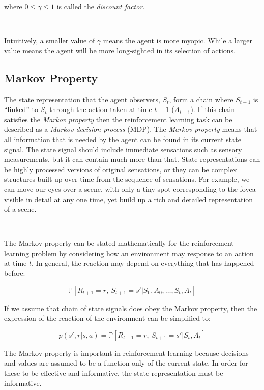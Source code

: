 \documentclass{article}
\begin{document}
where $0 \leq \gamma \leq 1$ is called the \textit{discount factor}.

\

Intuitively, a smaller value of $\gamma$ means the agent is more myopic. While a larger value means the agent will be more long-sighted in its selection of actions.

\subsection{Markov Property}

 The state representation that the agent observers, $S_t$, form a chain where $S_{t-1}$ is ``linked'' to $S_t$ through the action taken at time $t - 1$ ($A_{t-1}$). If this chain satisfies the \textit{Markov property} then the reinforcement learning task can be described as a \textit{Markov decision process} (MDP). The \textit{Markov property} means that all information that is needed by the agent can be found in its current state signal. The state signal should include immediate sensations such as sensory measurements, but it can contain much more than that. State representations can be highly processed versions of original sensations, or they can be complex structures built up over time from the sequence of sensations. For example, we can move our eyes over a scene, with only a tiny spot corresponding to the fovea visible in detail at any one time, yet build up a rich and detailed representation of a scene. \citep{sutton2018reinforcement}
 
 \
 
 The Markov property can be stated mathematically for the reinforcement learning problem by considering how an environment may response to an action at time $t$. In general, the reaction may depend on everything that has happened before:
 
 \begin{equation}
 	\mathbb{P}[ R_{t+1} = r, \ S_{t+1} = s' | S_0, A_0, \hdots, S_t, A_t]
 \end{equation}
 
 If we assume that chain of state signals does obey the Markov property, then the expression of the reaction of the environment can be simplified to:
 
 \begin{equation}
 	p(s', r | s, a) = \mathbb{P}[ R_{t+1} = r, \ S_{t+1} = s' | S_t, A_t]
 \end{equation}
 
 The Markov property is important in reinforcement learning because decisions and values are assumed to be a function only of the current state. In order for these to be effective and informative, the state representation must be informative. \citep{sutton2018reinforcement}
\end{document}
